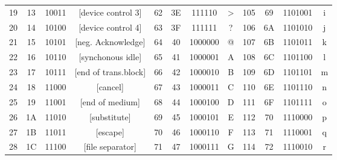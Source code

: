{{\begin{tabular}{cccc|cccc|cccc}
{\color[HTML]{9400FF} 19} & 13 & {\color[HTML]{9400FF} 10011} & {[}device control 3{]} & {\color[HTML]{9400FF} 62} & 3E & {\color[HTML]{9400FF} 111110} & \textgreater{} & {\color[HTML]{9400FF} 105} & 69 & {\color[HTML]{9400FF} 1101001} & i \\
{\color[HTML]{9400FF} 20} & 14 & {\color[HTML]{9400FF} 10100} & {[}device control 4{]} & {\color[HTML]{9400FF} 63} & 3F & {\color[HTML]{9400FF} 111111} & ? & {\color[HTML]{9400FF} 106} & 6A & {\color[HTML]{9400FF} 1101010} & j \\
{\color[HTML]{9400FF} 21} & 15 & {\color[HTML]{9400FF} 10101} & {[}neg. Acknowledge{]} & {\color[HTML]{9400FF} 64} & 40 & {\color[HTML]{9400FF} 1000000} & @ & {\color[HTML]{9400FF} 107} & 6B & {\color[HTML]{9400FF} 1101011} & k \\
{\color[HTML]{9400FF} 22} & 16 & {\color[HTML]{9400FF} 10110} & {[}synchonous idle{]} & {\color[HTML]{9400FF} 65} & 41 & {\color[HTML]{9400FF} 1000001} & A & {\color[HTML]{9400FF} 108} & 6C & {\color[HTML]{9400FF} 1101100} & l \\
{\color[HTML]{9400FF} 23} & 17 & {\color[HTML]{9400FF} 10111} & {[}end of trans.block{]} & {\color[HTML]{9400FF} 66} & 42 & {\color[HTML]{9400FF} 1000010} & B & {\color[HTML]{9400FF} 109} & 6D & {\color[HTML]{9400FF} 1101101} & m \\
{\color[HTML]{9400FF} 24} & 18 & {\color[HTML]{9400FF} 11000} & {[}cancel{]} & {\color[HTML]{9400FF} 67} & 43 & {\color[HTML]{9400FF} 1000011} & C & {\color[HTML]{9400FF} 110} & 6E & {\color[HTML]{9400FF} 1101110} & n \\
{\color[HTML]{9400FF} 25} & 19 & {\color[HTML]{9400FF} 11001} & {[}end of medium{]} & {\color[HTML]{9400FF} 68} & 44 & {\color[HTML]{9400FF} 1000100} & D & {\color[HTML]{9400FF} 111} & 6F & {\color[HTML]{9400FF} 1101111} & o \\
{\color[HTML]{9400FF} 26} & 1A & {\color[HTML]{9400FF} 11010} & {[}substitute{]} & {\color[HTML]{9400FF} 69} & 45 & {\color[HTML]{9400FF} 1000101} & E & {\color[HTML]{9400FF} 112} & 70 & {\color[HTML]{9400FF} 1110000} & p \\
{\color[HTML]{9400FF} 27} & 1B & {\color[HTML]{9400FF} 11011} & {[}escape{]} & {\color[HTML]{9400FF} 70} & 46 & {\color[HTML]{9400FF} 1000110} & F & {\color[HTML]{9400FF} 113} & 71 & {\color[HTML]{9400FF} 1110001} & q \\
{\color[HTML]{9400FF} 28} & 1C & {\color[HTML]{9400FF} 11100} & {[}file separator{]} & {\color[HTML]{9400FF} 71} & 47 & {\color[HTML]{9400FF} 1000111} & G & {\color[HTML]{9400FF} 114} & 72 & {\color[HTML]{9400FF} 1110010} & r \\

\end{tabular}}}
